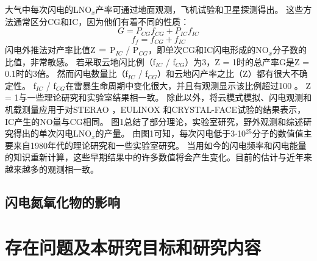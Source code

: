 大气中每次闪电的LNO$_x$产率可通过地面观测\citep{Noxon.1976}，飞机试验\citep{Chameides.1987}和卫星探测\citep{Beirle.2004}得出。
这些方法通常区分CG和IC，因为他们有着不同的性质：
\begin{equation}
G = P\textrm{$_{CG}$}f\textrm{$_{CG}$}  + P\textrm{$_{IC}$}f\textrm{$_{IC}$}
\end{equation}
\begin{equation}
f\textrm{$_{f}$}  = f\textrm{$_{CG}$}  + f\textrm{$_{IC}$}
\end{equation}
闪电外推法对产率比值Z ＝ P\textrm{$_{IC}$} / P\textrm{$_{CG}$}，即单次CG和IC闪电形成的NO$_x$分子数的比值，非常敏感\citep{Bond.2002}。
若采取云地闪比例（f\textrm{$_{IC}$} / f\textrm{$_{CG}$}）为3，Z = 1时的总产率G是Z = 0.1时的3倍\citep{Gallardo.1996,Ridley.2004,Ridley.2005}。
然而闪电数量比（f\textrm{$_{IC}$} / f\textrm{$_{CG}$}）和云地闪产率之比（Z）都有很大不确定性。
f\textrm{$_{IC}$} / f\textrm{$_{CG}$}在雷暴生命周期中变化很大，并且有观测显示该比例超过100 \citep{Dye.2000,DeCaria.2005,Ott.2007}。
Z = 1与一些理论研究\citep{Cooray.1997}和实验室结果\citep{Cooray.2005}相一致。
除此以外，将云模式模拟、闪电观测和机载测量应用于对STERAO \citep{DeCaria.2000}，EULINOX \citep{Fehr.2004}和CRYSTAL-FACE试验的结果表示，IC产生的NO量与CG相同。
图1总结了部分理论，实验室研究，野外观测和综述研究得出的单次闪电LNO$_x$的产量。
由图1可知，每次闪电低于3$\cdot$10$^{25}$分子的数值值主要来自1980年代的理论研究和一些实验室研究。
当用如今的闪电频率和闪电能量的知识重新计算，这些早期结果中的许多数值将会产生变化。目前的估计与近年来越来越多的观测相一致。



\subsection{闪电氮氧化物的影响}

\section{存在问题及本研究目标和研究内容}

